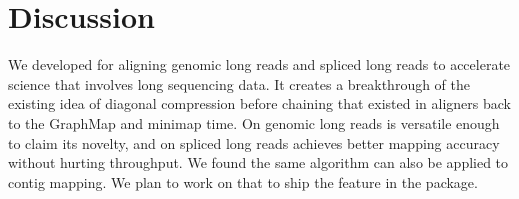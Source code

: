 \section{Discussion}

We developed \flash{} for aligning genomic long reads and spliced long reads to accelerate science that involves long sequencing data. It creates a breakthrough of the existing idea of diagonal compression before chaining that existed in aligners back to the GraphMap \citep{sovic2016graphmap} and minimap \citep{li2016minimap} time. On genomic long reads \flash{} is versatile enough to claim its novelty, and on spliced long reads \flash{} achieves better mapping accuracy without hurting throughput. We found the same algorithm can also be applied to contig mapping. We plan to work on that to ship the feature in the \flash{} package.
